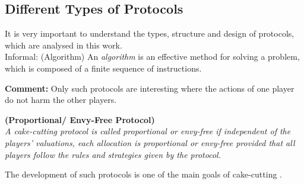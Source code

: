 \subsection{Different Types of Protocols}
It is very important to understand the types, structure and design of protocols, which are analysed in this work.\\
\newline
Informal: (Algorithm)
\newline An \emph{algorithm} is an effective method for solving a problem, which is composed of a finite sequence of instructions.
\textbf{Comment:} Only such protocols are interesting where the actions of one player do not harm the other players.
\begin{defi}{\textbf{(Proportional/ Envy-Free Protocol)}}\\
\emph{A cake-cutting \emph{protocol} is called \emph{proportional} or \emph{envy-free} if independent of the players' valuations, each allocation is proportional or envy-free provided that all players follow the rules and strategies given by the protocol.}
\end{defi}
The development of such protocols is one of the main goals of cake-cutting \cite{robertson:cake-cutting}.


